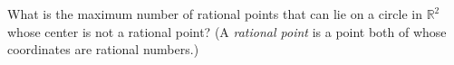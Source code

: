 What is the maximum number of rational points that can lie on a circle
in $\mathbb{R}^2$ whose center is not a rational point? (A \emph{rational
point} is a point both of whose coordinates are rational numbers.)
